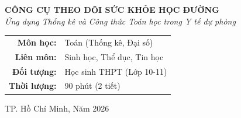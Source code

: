 \documentclass[12pt,a4paper]{article}
\begin{document}
\begin{titlepage}
    
    \vspace{8cm}
    \begin{center}
        {\Huge\bfseries CÔNG CỤ THEO DÕI SỨC KHỎE HỌC ĐƯỜNG}\\[1cm]
        {\Large\itshape Ứng dụng Thống kê và Công thức Toán học trong Y tế dự phòng}\\[3cm]
        
        \begin{tcolorbox}[width=0.8\textwidth, colback=medbg, colframe=medblue]
            \centering \large
            \begin{tabular}{rl}
                \textbf{Môn học:} & Toán (Thống kê, Đại số) \\
                \textbf{Liên môn:} & Sinh học, Thể dục, Tin học \\
                \textbf{Đối tượng:} & Học sinh THPT (Lớp 10-11) \\
                \textbf{Thời lượng:} & 90 phút (2 tiết)
            \end{tabular}
        \end{tcolorbox}
        
        \vfill
        {\large TP. Hồ Chí Minh, Năm 2026}
    \end{center}
\end{titlepage}

\tableofcontents
\newpage

\end{document}
